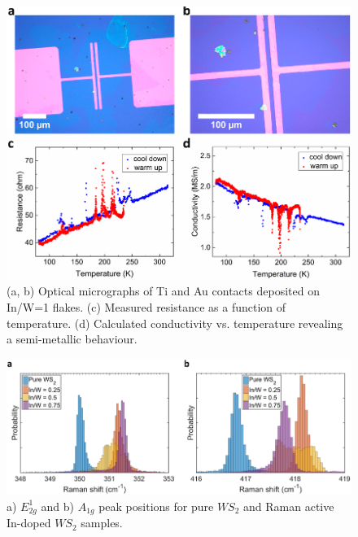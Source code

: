 \begin{figure}[!h]
	\begin{center}
		\includegraphics[scale=0.5]{In/ElectricalMeasurements.png}
		\caption{(a, b) Optical micrographs of Ti and Au contacts deposited on In/W=1 flakes. (c) Measured resistance as a function of temperature. (d) Calculated conductivity vs. temperature revealing a semi-metallic behaviour.}
		\label{fig:InElectricalMeasurement}
	\end{center}
\end{figure}

\newpage
\begin{figure}[!h]
	\begin{center}
		\includegraphics[scale=0.5]{In/RamanPositionHistogram.png}
		\caption{a) $E^1_{2g}$ and b) $A_{1g}$ peak positions for pure $WS_2$ and Raman active In-doped $WS_2$ samples.}
		\label{fig:InRamanPLHistogram}
	\end{center}
\end{figure}

